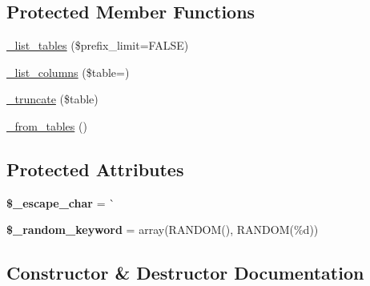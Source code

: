 \subsection*{Protected Member Functions}
\begin{DoxyCompactItemize}
\item 
\mbox{\hyperlink{class_c_i___d_b__pdo__cubrid__driver_afa72b19fd41d5cde641b19e60300bc8a}{\+\_\+list\+\_\+tables}} (\$prefix\+\_\+limit=F\+A\+L\+SE)
\item 
\mbox{\hyperlink{class_c_i___d_b__pdo__cubrid__driver_aee2ce1303247b157934c2ebd92e79d17}{\+\_\+list\+\_\+columns}} (\$table=\textquotesingle{}\textquotesingle{})
\item 
\mbox{\hyperlink{class_c_i___d_b__pdo__cubrid__driver_a48df755481b33830057f3f607e2e0ca9}{\+\_\+truncate}} (\$table)
\item 
\mbox{\hyperlink{class_c_i___d_b__pdo__cubrid__driver_a87b21656939f1994c6f5010f947d7f2a}{\+\_\+from\+\_\+tables}} ()
\end{DoxyCompactItemize}
\subsection*{Protected Attributes}
\begin{DoxyCompactItemize}
\item 
\mbox{\label{class_c_i___d_b__pdo__cubrid__driver_ab1961d96efb998ea9868e93190d2d7a4}} 
{\bfseries \$\+\_\+escape\+\_\+char} = \textquotesingle{}\`{}\textquotesingle{}
\item 
\mbox{\label{class_c_i___d_b__pdo__cubrid__driver_aae206a9a5db70ab73b8eaf7439b1608d}} 
{\bfseries \$\+\_\+random\+\_\+keyword} = array(\textquotesingle{}R\+A\+N\+D\+OM()\textquotesingle{}, \textquotesingle{}R\+A\+N\+D\+OM(\%d)\textquotesingle{})
\end{DoxyCompactItemize}


\subsection{Constructor \& Destructor Documentation}
\mbox{\label{class_c_i___d_b__pdo__cubrid__driver_a5cfa45da3a912dfd8117f3c2b942e591}} 
